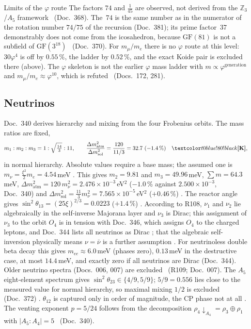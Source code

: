 \begin{ffkasten}{Limits of the $\varphi$ route}
The factors $74$ and $\tfrac1{45}$ are observed, not derived from the
$\mathbb Z_3$/$A_5$ framework \SM\ (Doc.~368). The~$74$ is the same number as in the numerator of
the rotation number $74/75$ of the recursion (Doc.~381); its prime factor~37 demonstrably does not
come from the icosahedron, because $\mathrm{GF}(81)$ is not a subfield of $\mathrm{GF}(3^{18})$
\BM\ (Doc.~370). For $m_\mu/m_e$ there is no $\varphi$ route at this level: $30\varphi^4$ is off by
$0.55\,\%$, the ladder by $0.52\,\%$, and the exact Koide pair is excluded there (above). The
$\varphi$ skeleton is not the earlier $\varphi$ mass ladder with $m\propto\varphi^{\text{generation}}$
and $m_\mu/m_e\approx\varphi^{10}$, which is refuted \XM\ (Docs.~172, 281).
\end{ffkasten}

\subsection{Neutrinos}

Doc.~340 derives hierarchy and mixing from the four Frobenius orbits. The mass ratios are fixed,
\begin{equation}
  m_1:m_2:m_3=1:\sqrt{\tfrac{14}{3}}:11,\qquad
  \frac{\Delta m^2_{\text{atm}}}{\Delta m^2_{\text{sol}}}=\frac{120}{11/3}=32.7\ (-1.4\,\%)\quad\KM ,
\end{equation}
in normal hierarchy. Absolute values require a base mass; the assumed one is
$m_\nu=\tfrac{\xi^2}{2}m_e=4.54$\,meV \SM. This gives $m_2=9.81$ and $m_3=49.96$\,meV,
$\sum m=64.3$\,meV, $\Delta m^2_{\text{atm}}=120\,m_\nu^2=2.476\times10^{-3}$\,eV$^2$ ($-1.0\,\%$
against $2.500\times10^{-3}$, Doc.~340) and $\Delta m^2_{\text{sol}}=\tfrac{11}{3}m_\nu^2=7.565\times10^{-5}$\,eV$^2$
($+0.46\,\%$) \KM. The reactor angle gives $\sin^2\theta_{13}=(25\xi)^{2/3}=0.0223$ ($+1.4\,\%$)
\KM. According to R108, $\nu_1$ and $\nu_2$ lie algebraically in the self-inverse Majorana layer
and $\nu_3$ is Dirac; this assignment of $\nu_3$ to the orbit $O_4$ is in tension with Doc.~346,
which assigns $O_4$ to the charged leptons, and Doc.~344 lists all neutrinos as Dirac \SM; that
the algebraic self-inversion physically means $\nu=\bar\nu$ is a further assumption \SM. For
neutrinoless double beta decay this gives $m_{ee}\approx6.0$\,meV (phases zero), $0.13$\,meV in
the destructive case, at most $14.4$\,meV, and exactly zero if all neutrinos are Dirac
(Doc.~344). Older neutrino spectra (Docs.~006, 007) are excluded \XM\ (R109; Doc.~007).
The $A_5$ eight-element spectrum gives $\sin^2\theta_{23}\in\{4/9,5/9\}$; $5/9=0.556$ lies close
to the measured value for normal hierarchy, so maximal mixing $1/2$ is excluded (Doc.~372) \KM.
$\theta_{12}$ is captured only in order of magnitude, the CP phase not at all \SM. The venting
exponent $p=5/24$ follows from the decomposition $\rho_4\!\downarrow_{A_4}=\rho_3\oplus\rho_1$
with $|A_5:A_4|=5$ \BM\ (Doc.~340).

